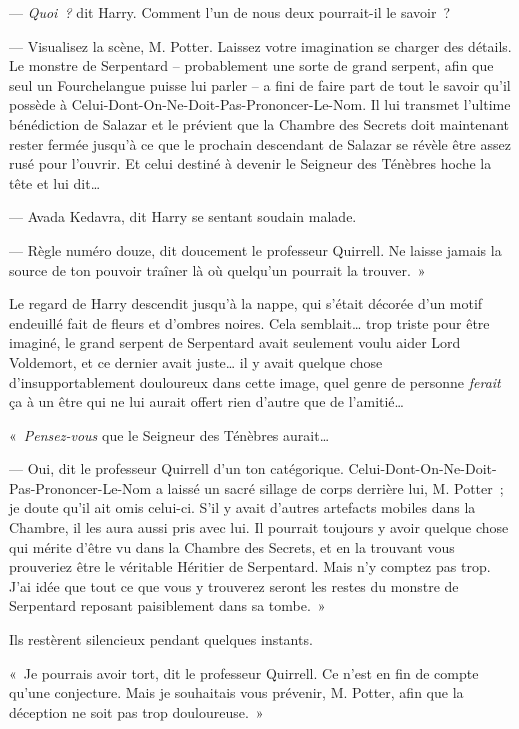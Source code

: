--- \emph{Quoi~?} dit Harry. Comment l'un de nous deux pourrait-il le savoir~?

--- Visualisez la scène, M. Potter. Laissez votre imagination se charger des détails. Le monstre de Serpentard -- probablement une sorte de grand serpent, afin que seul un Fourchelangue puisse lui parler -- a fini de faire part de tout le savoir qu'il possède à Celui-Dont-On-Ne-Doit-Pas-Prononcer-Le-Nom. Il lui transmet l'ultime bénédiction de Salazar et le prévient que la Chambre des Secrets doit maintenant rester fermée jusqu'à ce que le prochain descendant de Salazar se révèle être assez rusé pour l'ouvrir. Et celui destiné à devenir le Seigneur des Ténèbres hoche la tête et lui dit…

--- Avada Kedavra, dit Harry se sentant soudain malade.

--- Règle numéro douze, dit doucement le professeur Quirrell. Ne laisse jamais la source de ton pouvoir traîner là où quelqu'un pourrait la trouver.~»

Le regard de Harry descendit jusqu'à la nappe, qui s'était décorée d'un motif endeuillé fait de fleurs et d'ombres noires. Cela semblait… trop triste pour être imaginé, le grand serpent de Serpentard avait seulement voulu aider Lord Voldemort, et ce dernier avait juste… il y avait quelque chose d'insupportablement douloureux dans cette image, quel genre de personne \emph{ferait} ça à un être qui ne lui aurait offert rien d'autre que de l'amitié…

«~\emph{Pensez-vous} que le Seigneur des Ténèbres aurait…

--- Oui, dit le professeur Quirrell d'un ton catégorique. Celui-Dont-On-Ne-Doit-Pas-Prononcer-Le-Nom a laissé un sacré sillage de corps derrière lui, M. Potter~; je doute qu'il ait omis celui-ci. S'il y avait d'autres artefacts mobiles dans la Chambre, il les aura aussi pris avec lui. Il pourrait toujours y avoir quelque chose qui mérite d'être vu dans la Chambre des Secrets, et en la trouvant vous prouveriez être le véritable Héritier de Serpentard. Mais n'y comptez pas trop. J'ai idée que tout ce que vous y trouverez seront les restes du monstre de Serpentard reposant paisiblement dans sa tombe.~»

Ils restèrent silencieux pendant quelques instants.

«~Je pourrais avoir tort, dit le professeur Quirrell. Ce n'est en fin de compte qu'une conjecture. Mais je souhaitais vous prévenir, M. Potter, afin que la déception ne soit pas trop douloureuse.~»

